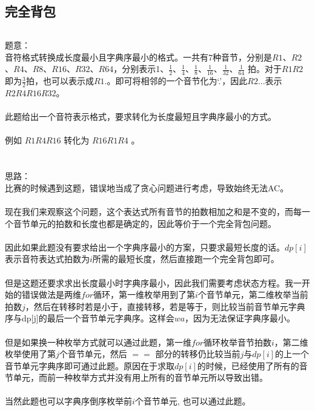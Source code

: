 \documentclass[twoside]{article}
\begin{document}
\subsection{完全背包}
\begin{lstlisting}
\end{lstlisting}
题意：\\
音符格式转换成长度最小且字典序最小的格式。一共有$7$种音节，分别是$R1$、$R2$、$R4$、$R8$、$R16$、$R32$、$R64$，分别表示1、$\frac{1}{2}$、$\frac{1}{4}$、$\frac{1}{8}$、$\frac{1}{16}$、$\frac{1}{32}$、$\frac{1}{64}$ 拍。对于$R1R2$即为$\frac{3}{2}$拍，也可以表示成$R1.$。即可将相邻的一个音节化为‘.’，因此$R2...$表示$R2R4R16R32$。\\
\\
此题给出一个音符表示格式，要求转化为长度最短且字典序最小的方式。\\
\\
例如 $R1R4R16$ 转化为 $R16R1R4$ 。\\
\\
\\
思路：\\
比赛的时候遇到这题，错误地当成了贪心问题进行考虑，导致始终无法AC。\\
\\
现在我们来观察这个问题，这个表达式所有音节的拍数相加之和是不变的，而每一个音节单元的拍数和长度也都是确定的，因此等价于一个完全背包问题。\\
\\
因此如果此题没有要求给出一个字典序最小的方案，只要求最短长度的话。$dp[i]$表示音符表达式拍数为$i$所需的最短长度，然后直接跑一个完全背包即可。\\
\\
但是这题还要求求出长度最小时字典序最小，因此我们需要考虑状态方程。我一开始的错误做法是两维$for$循环，第一维枚举用到了第$i$个音节单元，第二维枚举当前拍数$j$，然后在转移时若是小于，直接转移，若是等于，则比较当前音节单元字典序与dp[j]的最后一个音节单元字典序。这样会$wa$，因为无法保证字典序最小。\\
\\
但是如果换一种枚举方式就可以通过此题，第一维$for$循环枚举音节拍数$i$，第二维枚举使用了第$j$个音节单元，然后 $==$ 部分的转移仍比较当前$j$与$dp[i]$的上一个音节单元字典序即可通过此题。原因在于求取$dp[i]$的时候，已经使用了所有的音节单元，而前一种枚举方式并没有用上所有的音节单元所以导致出错。\\
\\
当然此题也可以字典序倒序枚举前$i$个音节单元, 也可以通过此题。\\
\\
\end{document}
